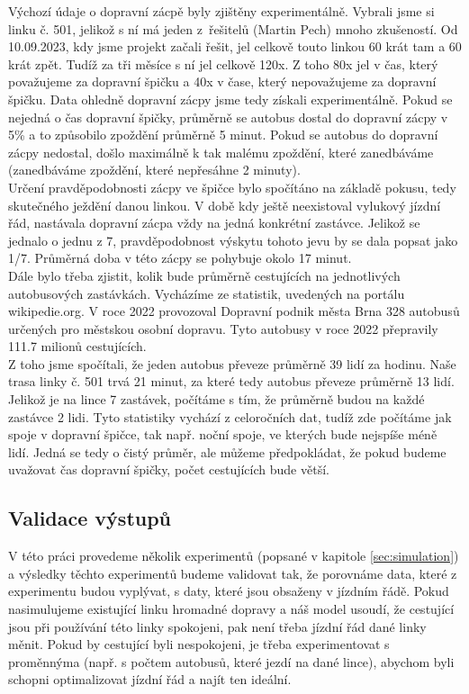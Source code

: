 \documentclass[a4paper]{article}
\begin{document}
            Výchozí údaje o dopravní zácpě byly zjištěny experimentálně. Vybrali jsme si linku č. 501, jelikož s ní má jeden z~řešitelů (Martin Pech) mnoho zkušeností. Od 10.09.2023, kdy jsme projekt začali řešit, jel celkově touto linkou 60 krát tam a 60 krát zpět. Tudíž za tři měsíce s ní jel celkově 120x. Z toho 80x jel v čas, který považujeme za dopravní špičku a 40x v čase, který nepovažujeme za dopravní špičku. Data ohledně dopravní zácpy jsme tedy získali experimentálně. Pokud se nejedná o čas dopravní špičky, průměrně se autobus dostal do dopravní zácpy v 5\% a to způsobilo zpoždění průměrně 5 minut. Pokud se autobus do dopravní zácpy nedostal, došlo maximálně k tak malému zpoždění, které zanedbáváme (zanedbáváme zpoždění, které nepřesáhne 2 minuty). \\
            Určení pravděpodobnosti zácpy ve špičce bylo spočítáno na základě pokusu, tedy skutečného ježdění danou linkou. V době kdy ještě neexistoval vylukový jízdní řád, nastávala dopravní zácpa vždy na jedná konkrétní zastávce. Jelikož se jednalo o jednu z 7, pravděpodobnost výskytu tohoto jevu by se dala popsat jako 1/7. Průměrná doba v této zácpy se pohybuje okolo 17 minut.\\
            Dále bylo třeba zjistit, kolik bude průměrně cestujících na jednotlivých autobusových zastávkách. Vycházíme ze statistik\cite{Pocet_cestujicich}, uvedených na portálu wikipedie.org. V roce 2022 provozoval Dopravní podnik města Brna 328 autobusů určených pro městskou osobní dopravu. Tyto autobusy v roce 2022 přepravily 111.7 milionů cestujících. \\
            Z toho jsme spočítali, že jeden autobus převeze průměrně 39 lidí za hodinu. Naše trasa linky č. 501 trvá 21 minut, za které tedy autobus převeze průměrně 13 lidí. Jelikož je na lince 7 zastávek, počítáme s tím, že průměrně budou na každé zastávce 2 lidi. Tyto statistiky vychází z celoročních dat, tudíž zde počítáme jak spoje v dopravní špičce, tak např. noční spoje, ve kterých bude nejspíše méně lidí. Jedná se tedy o čistý průměr, ale můžeme předpokládat, že pokud budeme uvažovat čas dopravní špičky, počet cestujících bude větší.

        \subsection{Validace výstupů}
        \label{subsec:validation}
        V této práci provedeme několik experimentů (popsané v kapitole \ref{sec:simulation}) a výsledky těchto experimentů budeme validovat tak, že porovnáme data, které z experimentu budou vyplývat, s daty, které jsou obsaženy v jízdním řádě. Pokud nasimulujeme existující linku hromadné dopravy a náš model usoudí, že cestující jsou při používání této linky spokojeni, pak není třeba jízdní řád dané linky měnit. Pokud by cestující byli nespokojeni, je třeba experimentovat s proměnnýma (např. s počtem autobusů, které jezdí na dané lince), abychom byli schopni optimalizovat jízdní řád a najít ten ideální.
	
\end{document}
